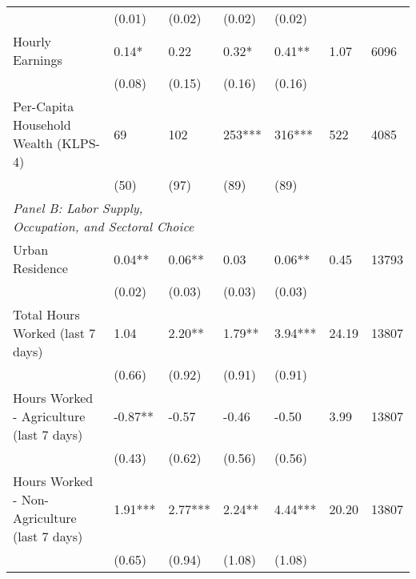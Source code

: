 \documentclass[8pt,a4paper,landscape]{article}
\newcommand{\sym}[1]{#1} %
\begin{document}
\begin{tabular}{lllllll}
            &      (0.01)         &      (0.02)         &      (0.02)         &      (0.02)         &                     &                     \\
Hourly Earnings&        0.14\sym{*}  &        0.22         &        0.32\sym{*}  &        0.41\sym{**} &        1.07         &     6096         \\
            &      (0.08)         &      (0.15)         &      (0.16)         &      (0.16)         &                     &                     \\
Per-Capita Household Wealth (KLPS-4)&          69         &         102         &         253\sym{***}&         316\sym{***}&         522         &        4085         \\
            &        (50)         &        (97)         &        (89)         &        (89)         &                     &                     \\
\midrule
\multicolumn{3}{l}{\emph{Panel B: Labor Supply, Occupation, and Sectoral Choice}} & \\ Urban Residence&        0.04\sym{**} &        0.06\sym{**} &        0.03         &        0.06\sym{**} &        0.45         &    13793          \\
            &      (0.02)         &      (0.03)         &      (0.03)         &      (0.03)         &                     &                     \\
Total Hours Worked (last 7 days)&        1.04         &        2.20\sym{**} &        1.79\sym{**} &        3.94\sym{***}&       24.19         &    13807         \\
            &      (0.66)         &      (0.92)         &      (0.91)         &      (0.91)         &                     &                     \\
Hours Worked - Agriculture (last 7 days)&       -0.87\sym{**} &       -0.57         &       -0.46         &       -0.50         &        3.99         &    13807         \\
            &      (0.43)         &      (0.62)         &      (0.56)         &      (0.56)         &                     &                     \\
Hours Worked - Non-Agriculture (last 7 days)&        1.91\sym{***}&        2.77\sym{***}&        2.24\sym{**} &        4.44\sym{***}&       20.20         &    13807         \\
            &      (0.65)         &      (0.94)         &      (1.08)         &      (1.08)         &                     &                     \\

\end{tabular}
\end{document}
